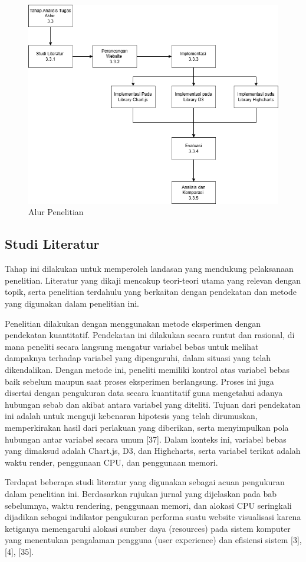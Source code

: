 \begin{figure}[H]
	\centering
	\includegraphics[width=0.8\linewidth]{gambar/Metodologi/Alur penelitian.png}
	\caption{Alur Penelitian}
	\label{Alur Penelitian}
\end{figure}

\subsection{Studi Literatur}
Tahap ini dilakukan untuk memperoleh landasan yang mendukung pelaksanaan penelitian. Literatur yang dikaji mencakup teori-teori utama yang relevan dengan topik, serta penelitian terdahulu yang berkaitan dengan pendekatan dan metode yang digunakan dalam penelitian ini. 

Penelitian dilakukan dengan menggunakan metode eksperimen dengan pendekatan kuantitatif. Pendekatan ini dilakukan secara runtut dan rasional, di mana peneliti secara langsung mengatur variabel bebas untuk melihat dampaknya terhadap variabel yang dipengaruhi, dalam situasi yang telah dikendalikan. Dengan metode ini, peneliti memiliki kontrol atas variabel bebas baik sebelum maupun saat proses eksperimen berlangsung. Proses ini juga disertai dengan pengukuran data secara kuantitatif guna mengetahui adanya hubungan sebab dan akibat antara variabel yang diteliti. Tujuan dari pendekatan ini adalah untuk menguji kebenaran hipotesis yang telah dirumuskan, memperkirakan hasil dari perlakuan yang diberikan, serta menyimpulkan pola hubungan antar variabel secara umum [37]. Dalam konteks ini, variabel bebas yang dimaksud adalah Chart.js, D3, dan Highcharts, serta variabel terikat adalah waktu render, penggunaan CPU, dan penggunaan memori.

Terdapat beberapa studi literatur yang digunakan sebagai acuan pengukuran dalam penelitian ini. Berdasarkan rujukan jurnal yang dijelaskan pada bab sebelumnya, waktu rendering, penggunaan memori, dan alokasi CPU seringkali dijadikan sebagai indikator pengukuran performa suatu website visualisasi karena ketiganya memengaruhi alokasi sumber daya (resources) pada sistem komputer yang menentukan pengalaman pengguna (user experience) dan efisiensi sistem [3], [4], [35].

